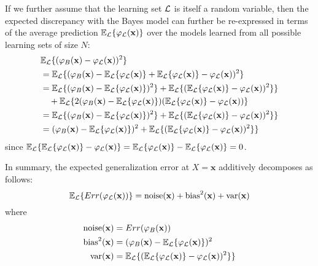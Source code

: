 If we further assume that the learning set ${\cal L}$ is itself a random
variable, then the expected discrepancy with the Bayes model can further be
re-expressed in terms of the average prediction $\mathbb{E}_{\cal L} \{
\varphi_{\cal L}(\mathbf{x}) \}$ over the models learned from all possible
learning sets of size $N$:
\begin{align}
& \mathbb{E}_{\cal L} \{ (\varphi_B(\mathbf{x}) - \varphi_{\cal L}(\mathbf{x}))^2 \}\nonumber \\
&= \mathbb{E}_{\cal L} \{ (\varphi_B(\mathbf{x}) - \mathbb{E}_{\cal L} \{ \varphi_{\cal L}(\mathbf{x}) \} + \mathbb{E}_{\cal L} \{ \varphi_{\cal L}(\mathbf{x}) \} - \varphi_{\cal L}(\mathbf{x}))^2 \} \nonumber \\
&= \mathbb{E}_{\cal L} \{ (\varphi_B(\mathbf{x}) - \mathbb{E}_{\cal L} \{ \varphi_{\cal L}(\mathbf{x}) \} )^2 \} + \mathbb{E}_{\cal L} \{ (\mathbb{E}_{\cal L} \{ \varphi_{\cal L}(\mathbf{x}) \} - \varphi_{\cal L}(\mathbf{x}))^2 \} \}\nonumber \\
& \quad+ \mathbb{E}_{\cal L} \{ 2(\varphi_B(\mathbf{x}) - \mathbb{E}_{\cal L} \{ \varphi_{\cal L}(\mathbf{x}) \})(\mathbb{E}_{\cal L} \{ \varphi_{\cal L}(\mathbf{x}) \} - \varphi_{\cal L}(\mathbf{x}))\} \nonumber \\
&= \mathbb{E}_{\cal L} \{ (\varphi_B(\mathbf{x}) - \mathbb{E}_{\cal L} \{ \varphi_{\cal L}(\mathbf{x}) \} )^2 \} + \mathbb{E}_{\cal L} \{ (\mathbb{E}_{\cal L} \{ \varphi_{\cal L}(\mathbf{x}) \} - \varphi_{\cal L}(\mathbf{x}))^2 \} \}\nonumber \\
&= (\varphi_B(\mathbf{x}) - \mathbb{E}_{\cal L} \{ \varphi_{\cal L}(\mathbf{x}) \} )^2 + \mathbb{E}_{\cal L} \{ (\mathbb{E}_{\cal L} \{ \varphi_{\cal L}(\mathbf{x}) \} - \varphi_{\cal L}(\mathbf{x}))^2 \} \}
\end{align}
since $\mathbb{E}_{\cal L}\{ \mathbb{E}_{\cal L} \{ \varphi_{\cal L}(\mathbf{x}) \} - \varphi_{\cal L}(\mathbf{x}) \} =  \mathbb{E}_{\cal L} \{ \varphi_{\cal L}(\mathbf{x}) \} -  \mathbb{E}_{\cal L} \{ \varphi_{\cal L}(\mathbf{x}) \} = 0$.

In summary, the expected generalization error at $X=\mathbf{x}$ additively
decomposes as follows:
\begin{equation}
\mathbb{E}_{\cal L} \{ Err(\varphi_{\cal L}(\mathbf{x})) \} = \text{noise}(\mathbf{x}) + \text{bias}^2(\mathbf{x}) + \text{var}(\mathbf{x})
\end{equation}
where
\begin{align}
\text{noise}(\mathbf{x}) &= Err(\varphi_B(\mathbf{x})) \\
\text{bias}^2(\mathbf{x}) &= (\varphi_B(\mathbf{x}) - \mathbb{E}_{\cal L} \{ \varphi_{\cal L}(\mathbf{x}) \} )^2 \\
\text{var}(\mathbf{x}) &= \mathbb{E}_{\cal L} \{ (\mathbb{E}_{\cal L} \{ \varphi_{\cal L}(\mathbf{x}) \} - \varphi_{\cal L}(\mathbf{x}))^2 \} \}
\end{align}

